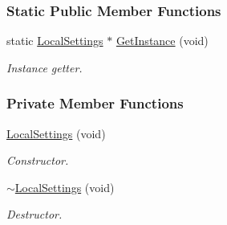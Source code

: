\subsubsection*{Static Public Member Functions}
\begin{DoxyCompactItemize}
\item 
static \hyperlink{group___core_class_local_settings}{Local\-Settings} $\ast$ \hyperlink{group___core_a80f6e158e8c61b70fd4efec296e28310}{Get\-Instance} (void)
\begin{DoxyCompactList}\small\item\em Instance getter. \end{DoxyCompactList}\end{DoxyCompactItemize}
\subsubsection*{Private Member Functions}
\begin{DoxyCompactItemize}
\item 
\hyperlink{group___core_a70ef22059fb84a1a64120f3122db615e}{Local\-Settings} (void)
\begin{DoxyCompactList}\small\item\em Constructor. \end{DoxyCompactList}\item 
\hyperlink{group___core_a043074a18b94b6c572e31feb2d283926}{$\sim$\-Local\-Settings} (void)
\begin{DoxyCompactList}\small\item\em Destructor. \end{DoxyCompactList}\end{DoxyCompactItemize}
